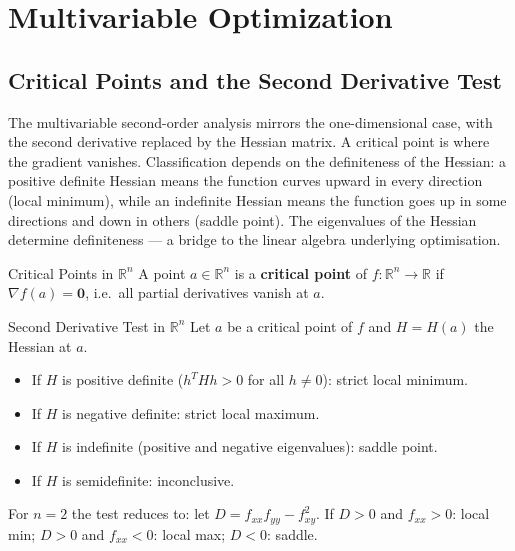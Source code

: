 \documentclass[12pt, openany]{book}
\theoremstyle{plain}
\theoremstyle{definition}
\theoremstyle{remark}
\newcommand{\R}{\mathbb{R}}
\begin{document}
\chapter{Multivariable Optimization}
\color{black}

\section{Critical Points and the Second Derivative Test}

The multivariable second-order analysis mirrors the one-dimensional case, with the second derivative replaced by the Hessian matrix.  A critical point is where the gradient vanishes.  Classification depends on the definiteness of the Hessian: a positive definite Hessian means the function curves upward in every direction (local minimum), while an indefinite Hessian means the function goes up in some directions and down in others (saddle point).  The eigenvalues of the Hessian determine definiteness --- a bridge to the linear algebra underlying optimisation.

\begin{defbox}{Critical Points in $\R^n$}
A point $a\in\R^n$ is a \textbf{critical point} of $f:\R^n\to\R$ if
$\nabla f(a)=\mathbf{0}$, i.e.\ all partial derivatives vanish at $a$.
\end{defbox}
\color{black}

\begin{thmbox}{Second Derivative Test in $\R^n$}
Let $a$ be a critical point of $f$ and $H=H(a)$ the Hessian at $a$.
\begin{itemize}[noitemsep]
  \item If $H$ is positive definite ($h^T Hh>0$ for all $h\neq 0$): strict local minimum.
  \item If $H$ is negative definite: strict local maximum.
  \item If $H$ is indefinite (positive and negative eigenvalues): saddle point.
  \item If $H$ is semidefinite: inconclusive.
\end{itemize}
\end{thmbox}
\color{black}

For $n=2$ the test reduces to: let $D=f_{xx}f_{yy}-f_{xy}^2$.
If $D>0$ and $f_{xx}>0$: local min; $D>0$ and $f_{xx}<0$: local max; $D<0$: saddle.
\end{document}
